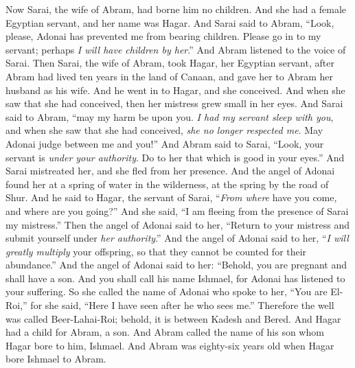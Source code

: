 \begin{biblechapter} %
 Now Sarai, the wife of Abram, had borne him no children. And she had a female Egyptian servant, and her name was Hagar.
\verse And Sarai said to Abram, “Look, please, Adonai has prevented me from bearing children. Please go in to my servant; perhaps \textit{I will have children by her}.” And Abram listened to the voice of Sarai.
\verse Then Sarai, the wife of Abram, took Hagar, her Egyptian servant, after Abram had lived ten years in the land of Canaan, and gave her to Abram her husband as his wife.
\verse And he went in to Hagar, and she conceived. And when she saw that she had conceived, then her mistress grew small in her eyes.
\verse And Sarai said to Abram, “may my harm be upon you. \textit{I had my servant sleep with you}, and when she saw that she had conceived, \textit{she no longer respected me}. May Adonai judge between me and you!”
\verse And Abram said to Sarai, “Look, your servant is \textit{under your authority}. Do to her that which is good in your eyes.” And Sarai mistreated her, and she fled from her presence.
 And the angel of Adonai found her at a spring of water in the wilderness, at the spring by the road of Shur.
\verse And he said to Hagar, the servant of Sarai, “\textit{From where} have you come, and where are you going?” And she said, “I am fleeing from the presence of Sarai my mistress.”
\verse Then the angel of Adonai said to her, “Return to your mistress and submit yourself under \textit{her authority}.”
\verse And the angel of Adonai said to her, “\textit{I will greatly multiply} your offspring, so that they cannot be counted for their abundance.”
\verse And the angel of Adonai said to her:
\verse “Behold, you are pregnant 
and shall have a son. 
And you shall call his name Ishmael, 
for Adonai has listened to your suffering.
\verse So she called the name of Adonai who spoke to her, “You are El-Roi,” for she said, “Here I have seen after he who sees me.”
\verse Therefore the well was called Beer-Lahai-Roi; behold, it is between Kadesh and Bered.
\verse And Hagar had a child for Abram, a son. And Abram called the name of his son whom Hagar bore to him, Ishmael.
\verse And Abram was eighty-six years old when Hagar bore Ishmael to Abram.
\end{biblechapter}

